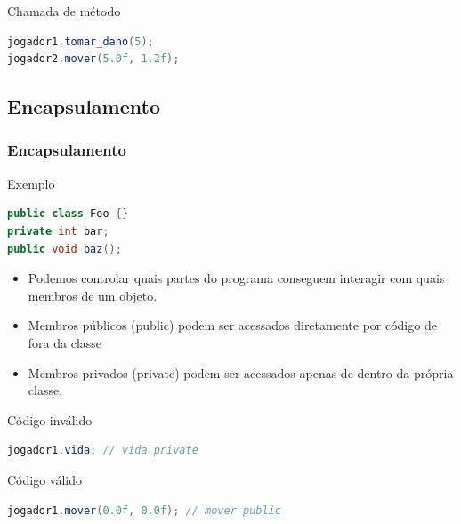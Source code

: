 \documentclass{beamer}
\begin{document}
	\begin{frame}[fragile]
		\begin{block}{Chamada de método}
			\begin{lstlisting}[language=Java,basicstyle=\ttfamily,keywordstyle=\color{blue}]
jogador1.tomar_dano(5);
jogador2.mover(5.0f, 1.2f);
			\end{lstlisting}
		\end{block}
	\end{frame}

	\subsection{Encapsulamento} %
	\begin{frame}[fragile]
		\frametitle{Encapsulamento}
		\begin{block}{Exemplo}
			\begin{lstlisting}[language=Java,basicstyle=\ttfamily,keywordstyle=\color{blue}]
public class Foo {}
private int bar;
public void baz();
			\end{lstlisting}
		\end{block}

		\begin{itemize}
			\item Podemos controlar quais partes do programa conseguem
				interagir com quais membros de um objeto.

			\item Membros públicos (public) podem ser acessados diretamente por
				código de fora da classe

			\item Membros privados (private) podem ser acessados apenas de
				dentro da própria classe.
		\end{itemize}

	\end{frame}

	\begin{frame}[fragile]
		\begin{alertblock}{Código inválido}
			\begin{lstlisting}[language=Java,basicstyle=\ttfamily,keywordstyle=\color{blue}]
jogador1.vida; // vida private
			\end{lstlisting}
		\end{alertblock}

		\begin{block}{Código válido}
			\begin{lstlisting}[language=Java,basicstyle=\ttfamily,keywordstyle=\color{blue}]
jogador1.mover(0.0f, 0.0f); // mover public
			\end{lstlisting}
		\end{block}
	\end{frame}
\end{document}
